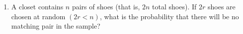 \documentclass[10pt,twoside]{article}
\begin{document}
\begin{enumerate}
    
    \item A closet contains $n$ pairs of shoes (that is, $2n$ total shoes). If $2r$ shoes are chosen at random $(2r < n)$, what is the probability that there will be no matching pair in the sample? 
    

\end{enumerate}
\end{document}
